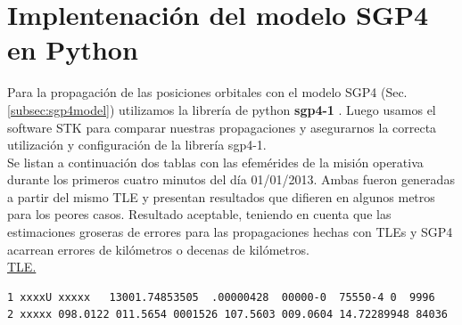 \section{Implentenaci\'on del modelo SGP4 en Python}

Para la propagaci\'on de las posiciones orbitales con el modelo SGP4 (Sec. \ref{subsec:sgp4model}) utilizamos la librer\'ia de python {\bf{sgp4-1}} \citep{sgp4python}.
Luego usamos el software STK para comparar nuestras propagaciones y asegurarnos la correcta utilizaci\'on y configuraci\'on de la librer\'ia sgp4-1.\\

Se listan a continuaci\'on dos tablas con las efem\'erides de la misi\'on operativa durante los primeros cuatro minutos del d\'ia 01/01/2013.
Ambas fueron generadas a partir del mismo TLE y presentan resultados que difieren en algunos metros para los peores casos. Resultado aceptable, teniendo en cuenta que las estimaciones groseras de errores para las propagaciones hechas con TLEs y SGP4 acarrean errores de kil\'ometros o decenas de kil\'ometros.\\

\underline{TLE.}
{\small
\begin{verbatim}
1 xxxxU xxxxx   13001.74853505  .00000428  00000-0  75550-4 0  9996
2 xxxxx 098.0122 011.5654 0001526 107.5603 009.0604 14.72289948 84036
\end{verbatim}}


\begin{table}[!h]
\caption{Resultados que genera ARxCODE utilizando la librer\'ia sgp4 de python para la propagaci\'on.}
\centering
{}
\end{table}

